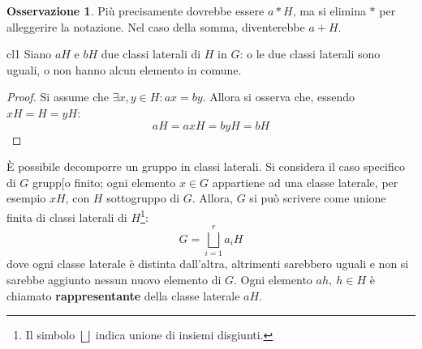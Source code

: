 \documentclass[11pt, a4paper]{scrartcl}
\theoremstyle{definition}
\numberwithin{esempio}{section}
\theoremstyle{definition}
\newtheorem{obs}{Osservazione}
\numberwithin{obs}{section}
\numberwithin{nota}{section}
\numberwithin{equation}{subsection}
\begin{document}
\begin{obs}
	Pi\`u precisamente dovrebbe essere $a * H$, ma si elimina $*$ per alleggerire la notazione. Nel caso della somma, diventerebbe $a+ H$.
\end{obs}
\begin{teorema}
	{}{cl1}
	Siano $aH$ e $bH$ due classi laterali di $H$ in $G$: o le due classi laterali sono uguali, o non hanno alcun elemento in comune.
	\begin{proof}
		Si assume che $\exists x,y \in H: ax= by$. Allora si osserva che, essendo $xH = H = yH$:
		\[
		aH = axH = byH = bH
		\] 
	\end{proof}
\end{teorema}
\`E possibile decomporre un gruppo in classi laterali. 
Si considera il caso specifico di $G$ grupp[o finito; ogni elemento $x \in G$ appartiene ad una classe laterale, per esempio $xH$, con $H$ sottogruppo di $G$.
Allora, $G$ si pu\`o scrivere come unione finita di classi laterali di $H$\footnote{Il simbolo $\bigsqcup$ indica unione di insiemi disgiunti.}:
\begin{equation}
	G = \bigsqcup_{i=1} ^r a _i H
\end{equation}
dove ogni classe laterale \`e distinta dall'altra, altrimenti sarebbero uguali e non si sarebbe aggiunto nessun nuovo elemento di $G$.
Ogni elemento $ah, \ h \in H$ \`e chiamato \textbf{rappresentante} della classe laterale $aH$.
\end{document}
